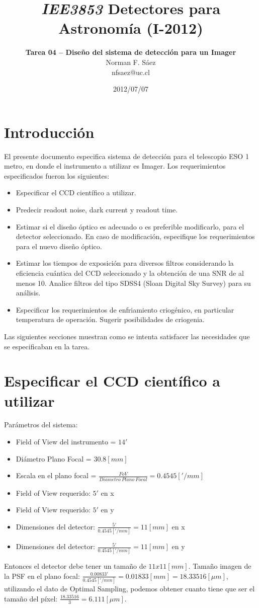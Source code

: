 \documentclass[a4paper,10pt]{article}
\title{\textit{IEE3853} Detectores para Astronomía (I-2012)}
\author{\textbf{Tarea 04 – Diseño del sistema de detección para un Imager} \\Norman F. Sáez\\nfsaez@uc.cl}
\date{2012/07/07}
\begin{document}
%
\maketitle
\section*{Introducción}

El presente documento especifica sistema de detección para el telescopio ESO 1
metro, en donde el instrumento a utilizar es Imager.  Los requerimientos
especificados fueron los siguientes:

\begin{itemize}
\item Especificar el CCD científico a utilizar.

\item Predecir readout noise, dark current y readout time.

\item Estimar si el diseño óptico es adecuado o es preferible modificarlo, para
el detector seleccionado. En caso de modificación, especifique los
requerimientos para el nuevo diseño óptico.

\item Estimar los tiempos de exposición para diversos filtros considerando la
eficiencia cuántica del CCD seleccionado y la obtención de una SNR de al menos
10. Analice filtros del tipo SDSS4 (Sloan Digital Sky Survey) para su análisis.

\item Especificar los requerimientos de enfriamiento criogénico, en particular
temperatura de operación. Sugerir posibilidades de criogenia.
\end{itemize}

Las siguientes secciones muestran como se intenta satisfacer las necesidades que se especificaban en la tarea.


\section{Especificar el CCD científico a utilizar}
Parámetros del sistema:
\begin{itemize}
\item Field of View del instrumento = $14 '$
\item Diámetro Plano Focal = $30.8 [mm]$
\item Escala en el plano focal = $\frac{FoV}{Diametro\ Plano\ Focal} = 0.4545 ['/mm]$
\item Field of View requerido: $5'$ en x
\item Field of View requerido: $5'$ en y
\item Dimensiones del detector: $\frac{5'}{0.4545['/mm]} = 11 [mm]$ en x
\item Dimensiones del detector: $\frac{5'}{0.4545['/mm]} = 11 [mm]$ en y
\end{itemize}
Entonces el detector debe tener un tamaño de $11x11[mm]$.  Tamaño imagen de la
PSF en el plano focal: $\frac{0.00833'}{0.4545 ['/mm]} = 0.01833[mm] = 18.33516
[\mu m]$, utilizando el dato de Optimal Sampling, podemos obtener cuanto tiene
que ser el tamaño del píxel: $\frac{18.33516}{3} = 6.111 [\mu m]$.
\end{document}
